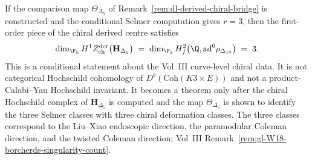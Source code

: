 \begin{remark}
\label{rem:dl-selmer-cross-volume}
If the comparison map $\Theta_{\Delta_5}$ of
Remark~\ref{rem:dl-derived-chiral-bridge} is constructed and the
conditional Selmer computation gives $r=3$, then the first-order
piece of the chiral derived centre satisfies
\[
 \dim_{\F_5} H^1 Z^{\mathrm{der}}_{\mathrm{ch}}\bigl(\mathbf H_{\Delta_5}\bigr)
 \;=\;
 \dim_{\F_5} H^2_f\bigl(\Q,\mathrm{ad}^0\rho_{\Delta_{10}}\bigr)
 \;=\; 3.
\]
This is a conditional statement about the Vol~III curve-level chiral
data. It is not categorical Hochschild cohomology of
$D^b(\mathrm{Coh}(K3\times E))$ and not a product-Calabi--Yau
Hochschild invariant. It becomes a theorem only after the chiral
Hochschild complex of
$\mathbf H_{\Delta_5}$ is computed and the map $\Theta_{\Delta_5}$ is
shown to identify the three Selmer classes with three chiral
deformation classes. The three classes correspond to the
Liu--Xiao endoscopic direction, the paramodular Coleman direction,
and the twisted Coleman direction; Vol~III
Remark~\ref{rem:gl-W18-borcherds-singularity-count}.
\end{remark}
